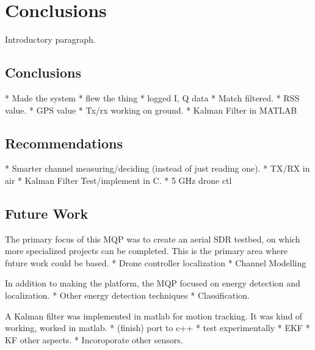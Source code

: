 \chapter{Conclusions}
Introductory paragraph.


\section{Conclusions}
* Made the system
* flew the thing
* logged I, Q data
* Match filtered.
* RSS value.
* GPS value
* Tx/rx working on ground.
* Kalman Filter in MATLAB


\section{Recommendations}
 * Smarter channel measuring/deciding (instead of just reading one).
 * TX/RX in air
 * Kalman Filter Test/implement in C.
 * 5 GHz drone ctl


\section{Future Work}
The primary focus of this MQP was to create an aerial SDR testbed, on which more 
specialized projects can be completed. This is the primary area where future work
could be based. 
 * Drone controller localization 
 * Channel Modelling  \par

In addition to making the platform, the MQP focused on energy detection 
and localization. 
 * Other energy detection techniques
 * Classification. \par

A Kalman filter was implemented in matlab for motion tracking. It was kind of 
working, worked in matlab. 
 * (finish) port to c++
 * test experimentally
 * EKF
 * KF other aspects.
 * Incoroporate other sensors.